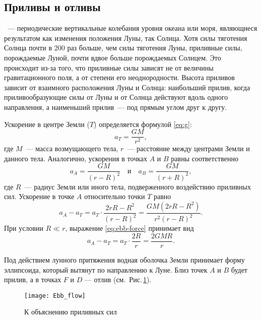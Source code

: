 \subsection{Приливы и отливы}

~--- периодические вертикальные колебания уровня океана или моря, являющиеся результатом как изменения положения Луны, так Солнца. Хотя силы тяготения Солнца почти в 200 раз больше, чем силы тяготения Луны, приливные силы, порождаемые Луной, почти вдвое больше порождаемых Солнцем. Это происходит из-за того, что приливные силы зависят не от величины гравитационного поля, а от степени его неоднородности. Высота приливов зависит от взаимного расположения Луны и Солнца: наибольший прилив, когда приливообразующие силы от Луны и от Солнца действуют вдоль одного направления, а наименьший прилив~--- под прямым углом друг к другу.

Ускорение в центре Земли ($T$) определяется формулой \eqref{eq:g}:
\begin{equation}
	a_T=\frac{G M}{r^2},
\end{equation}
где $M$~--- масса возмущающего тела, $r$~--- расстояние между центрами Земли и данного тела. Аналогично, ускорения в точках $A$ и $B$ равны соответственно
\begin{equation}
	a_A = \frac{G M}{(r - R)^2} \quad \text{и} \quad a_B = \frac{GM}{(r + R)^2},
\end{equation}
где $R$~--- радиус Земли или иного тела, подверженного воздействию приливных сил. Ускорение в точке $A$ относительно точки $T$ равно
\begin{equation}
	a_A - a_T = a_T \cdot \frac{2 r R - R^2}{(r - R)^2} = \frac{GM \left(2 r R - R^2 \right)}{r^2 (r - R)^2}.
	\label{eq:ebb-force}
\end{equation}
При условии $R\ll r$, выражение \eqref{eq:ebb-force} принимает вид \begin{equation}
a_A - a_T = a_T \cdot \frac{2 R}{r} = \frac{2 G M R}{r}.
\end{equation}

Под действием лунного притяжения водная оболочка Земли принимает форму 
эллипсоида, который вытянут по направлению к Луне. Близ точек $A$ и $B$ будет 
прилив, а в точках $F$ и $D$ --- отлив (см.~Рис.\,\ref{Ebb_flow}).
\begin{figure}[h!]
	\centering
	\texttt{[image: Ebb\_flow]}
	\caption{К объяснению приливных сил}\label{Ebb_flow}
\end{figure}
